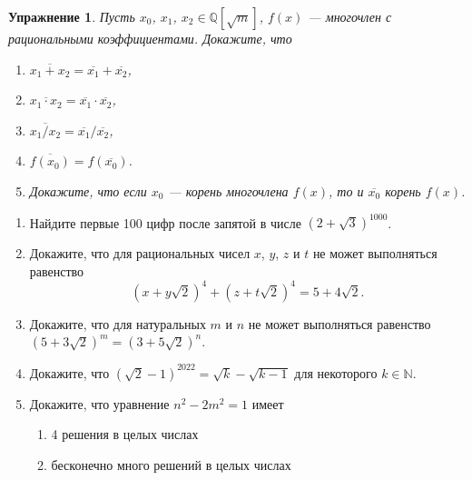 \documentclass{article}
\newtheorem{exercise}{Упражнение}
\begin{document}
\begin{exercise}
Пусть $x_0$, $x_1$, $x_2\in \mathbb{Q}[\sqrt{m}]$, $f(x)$ --- многочлен с рациональными 
коэффициентами. Докажите, что 
\begin{enumerate}[label*=\alph*)]
	\item $\overline{x_1+x_2}=\overline{x_1}+\overline{x_2}$,
	\item $\overline{x_1\cdot x_2}=\overline{x_1}\cdot \overline{x_2}$,
	\item $\overline{x_1/x_2}=\overline{x_1}/\overline{x_2}$, 
	\item $\overline{f(x_0)}=f(\overline{x_0})$.
	\item Докажите, что если $x_0$ --- корень многочлена $f(x)$, то и $\overline{x_0}$ корень $f(x)$.
\end{enumerate}
\end{exercise}

\begin{enumerate}[label*=\protect\fbox{\arabic{enumi}}]
	
	\item Найдите первые 100 цифр после запятой в числе $(2+\sqrt{3})^{1000}$. 
	
	\item Докажите, что для рациональных чисел $x$, $y$, $z$ и $t$ не может выполняться равенство
	$$(x+y\sqrt{2})^4+(z+t\sqrt{2})^4=5+4\sqrt{2}.$$
	
	\item Докажите, что для натуральных $m$ и $n$ не может выполняться равенство
	$(5+3\sqrt{2})^m=(3+5\sqrt{2})^n$.
	
	\item Докажите, что $(\sqrt{2}-1)^{2022}=\sqrt{k}-\sqrt{k-1}$ для некоторого $k\in \mathbb{N}$. 
	
	\item Докажите, что уравнение $n^2-2m^2 = 1$ имеет 
	\begin{enumerate}
		\item 4 решения в целых числах
		\item бесконечно много решений в целых числах
\end{enumerate}
\end{enumerate}
\end{document}
